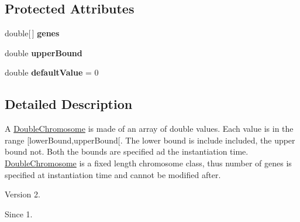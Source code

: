 \subsection*{Protected Attributes}
\begin{DoxyCompactItemize}
\item 
\hypertarget{classjenes_1_1chromosome_1_1_double_chromosome_a0a987b7f1fa1c4cec652330ad77b6ba6}{double\mbox{[}$\,$\mbox{]} {\bfseries genes}}\label{classjenes_1_1chromosome_1_1_double_chromosome_a0a987b7f1fa1c4cec652330ad77b6ba6}

\item 
\hypertarget{classjenes_1_1chromosome_1_1_double_chromosome_a56362107033b220e75d83b75ea91b74e}{double {\bfseries upper\-Bound}}\label{classjenes_1_1chromosome_1_1_double_chromosome_a56362107033b220e75d83b75ea91b74e}

\item 
\hypertarget{classjenes_1_1chromosome_1_1_double_chromosome_a5c2d56f7d05b08c75013a7529ae46839}{double {\bfseries default\-Value} = 0}\label{classjenes_1_1chromosome_1_1_double_chromosome_a5c2d56f7d05b08c75013a7529ae46839}

\end{DoxyCompactItemize}


\subsection{Detailed Description}
A \hyperlink{classjenes_1_1chromosome_1_1_double_chromosome}{Double\-Chromosome} is made of an array of double values. Each value is in the range \mbox{[}lower\-Bound,upper\-Bound\mbox{[}. The lower bound is include included, the upper bound not. Both the bounds are specified ad the instantiation time. \hyperlink{classjenes_1_1chromosome_1_1_double_chromosome}{Double\-Chromosome} is a fixed length chromosome class, thus number of genes is specified at instantiation time and cannot be modified after.

\begin{DoxyVersion}{Version}
2. 
\end{DoxyVersion}
\begin{DoxySince}{Since}
1. 
\end{DoxySince}


